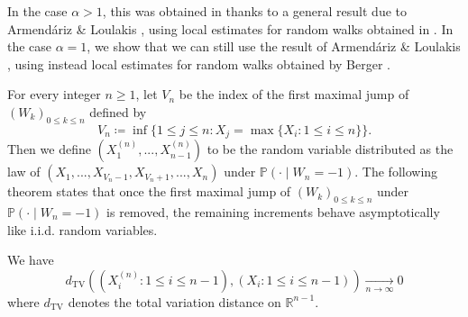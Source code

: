 \documentclass[a4paper,11pt]{article}
\DeclareRobustCommand{\P}{\mathbb{P}}
\DeclareRobustCommand{\to}{\xrightarrow[n\rightarrow \infty]{}}
\begin{document}
In the case $\alpha>1$, this was obtained in \cite{Kortchemski_2013} thanks to a general result due to Armend\'ariz \& Loulakis \cite{AL11}, using local estimates for random walks obtained in \cite{DDS08}. In the case $\alpha=1$, we show that we can still use the result of Armend\'ariz \& Loulakis \cite{AL11}, using instead local estimates for random walks obtained by Berger \cite{Ber17}.


 For every integer $n \geq 1$, let $V_{n}$ be the index of the first maximal jump of $(W_{k})_{0 \leq k \leq n}$ defined by
            \begin{equation*}
                V_n \coloneqq \inf\Big\{1\leq j\leq n:X_j=\max\{X_i:1\leq i\leq n\}\Big\}.
            \end{equation*}
            Then we define $(X_1^{(n)},...,X_{n-1}^{(n)})$ to be the random variable distributed as the law of $(X_1,...,X_{V_n-1},X_{V_n+1},...,X_n)$ under $\P(\cdot\mid W_n=-1)$. The following theorem states that once the first maximal jump of $(W_k)_{0 \leq k \leq n}$ under $\P(\cdot\mid W_n=-1)$ is removed, the remaining increments behave asymptotically like i.i.d. random variables.
            \begin{theorem}
            \label{th:asy iid}
                We have
                \begin{equation*}
                    d_{\mathrm{TV}} \left((X_i^{(n)}:1\leq i\leq n-1),(X_i:1\leq i\leq n-1)\right) \to 0
                \end{equation*}
                where $d_{\mathrm{TV}}$ denotes the total variation distance on $\mathbb{R}^{n-1}$.
            \end{theorem}
            
\end{document}
